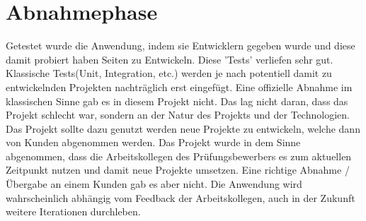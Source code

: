 \section{Abnahmephase} 
\label{sec:Abnahmephase}
Getestet wurde die Anwendung, indem sie Entwicklern gegeben wurde und diese damit probiert haben Seiten zu Entwickeln. Diese 'Tests' verliefen sehr gut. Klassische Tests(Unit, Integration, etc.) werden je nach potentiell damit zu entwickelnden Projekten nachträglich erst eingefügt. Eine offizielle Abnahme im klassischen Sinne gab es in diesem Projekt nicht. Das lag nicht daran, dass das Projekt schlecht war, sondern an der Natur des Projekts und der Technologien. Das Projekt sollte dazu genutzt werden neue Projekte zu entwickeln, welche dann von Kunden abgenommen werden. Das Projekt wurde in dem Sinne abgenommen, dass die Arbeitskollegen des Prüfungsbewerbers es zum aktuellen Zeitpunkt nutzen und damit neue Projekte umsetzen. Eine richtige Abnahme / Übergabe an einem Kunden gab es aber nicht. Die Anwendung wird wahrscheinlich abhängig vom Feedback der Arbeitskollegen, auch in der Zukunft weitere Iterationen durchleben.
